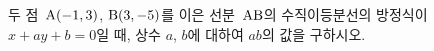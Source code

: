 두 점~$\mathrm{A}(-1{,}\mkern3mu\mathopen{}3)$, $\mathrm{B}(3{,}\mkern3mu\mathopen{}-5)$를 이은 선분~$\mathrm{AB}$의 수직이등분선의 방정식이 $x+ay+b=0$일 때, 상수 $a$, $b$에 대하여 $ab$의 값을 구하시오.

